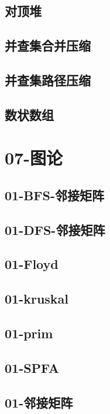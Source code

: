 \documentclass[10pt,a4paper]{article}
\begin{document}
\subsection{对顶堆}

\subsection{并查集合并压缩}

\subsection{并查集路径压缩}

\subsection{数状数组}

\section{07-图论}
\subsection{01-BFS-邻接矩阵}

\subsection{01-DFS-邻接矩阵}

\subsection{01-Floyd}

\subsection{01-kruskal}

\subsection{01-prim}

\subsection{01-SPFA}

\subsection{01-邻接矩阵}

\end{document}
